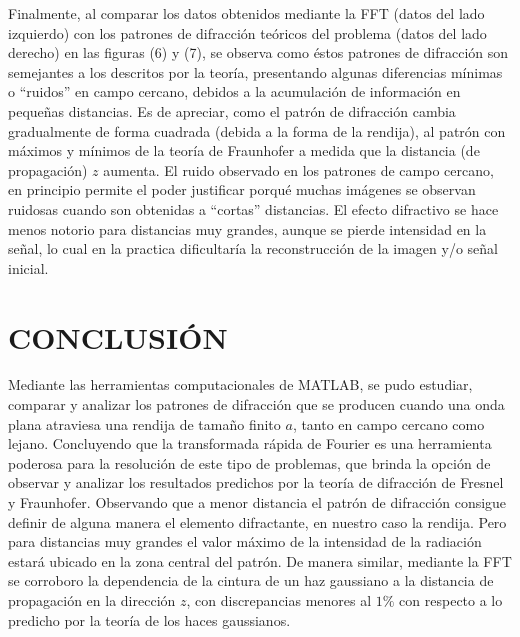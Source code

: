 \documentclass[11pt,letterpaper,twocolumn]{article}
\begin{document}
Finalmente, al comparar los datos obtenidos mediante la FFT (datos del lado izquierdo) con los patrones de difracción teóricos del problema (datos del lado derecho) en las figuras (6) y (7), se observa como éstos patrones de difracción son semejantes a los descritos por la teoría, presentando algunas diferencias mínimas o ``ruidos'' en campo cercano, debidos a la acumulación de información en pequeñas distancias. Es de apreciar, como el patrón de difracción cambia gradualmente de forma cuadrada (debida a la forma de la rendija), al patrón con máximos y mínimos de la teoría de Fraunhofer a medida que la distancia (de propagación) $z$ aumenta. El ruido observado en los patrones de campo cercano, en principio permite el poder justificar porqué muchas imágenes se observan ruidosas cuando son obtenidas a “cortas” distancias. El efecto difractivo se hace menos notorio para distancias muy grandes, aunque se pierde intensidad en la señal, lo cual en la practica dificultaría la reconstrucción de la imagen y/o señal inicial.

\section*{\normalsize{CONCLUSIÓN}}
Mediante las herramientas computacionales de MATLAB, se pudo estudiar, comparar y analizar los patrones de difracción que se producen cuando una onda plana atraviesa una rendija de tamaño finito $a$, tanto en campo cercano como lejano. Concluyendo que la transformada rápida de Fourier es una herramienta poderosa para la resolución de este tipo de problemas, que brinda la opción de observar y analizar los resultados predichos por la teoría de difracción de Fresnel y Fraunhofer. Observando que a menor distancia el patrón de difracción consigue definir de alguna manera el elemento difractante, en nuestro caso la rendija. Pero para distancias muy grandes el valor máximo de la intensidad de la radiación estará ubicado en la zona central del patrón. De manera similar, mediante la FFT se corroboro la dependencia de la cintura de un haz gaussiano a la distancia de propagación en la dirección $z$, con discrepancias menores al $1\%$ con respecto a lo predicho por la teoría de los haces gaussianos.
\end{document}
